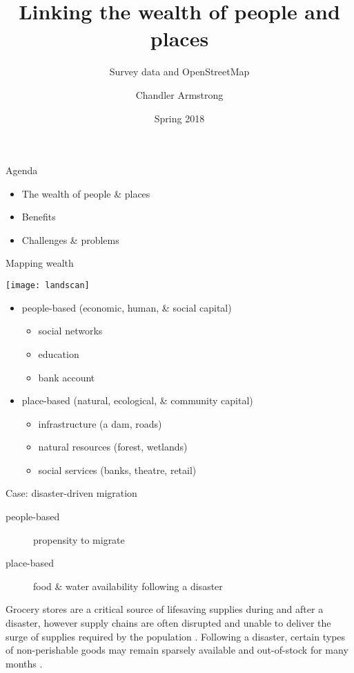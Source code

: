 \documentclass{beamer}
\title{Linking the wealth of people and places}
\subtitle{Survey data and OpenStreetMap}
\author{Chandler Armstrong}
\institute{CERL}
\date{Spring 2018}
\begin{document}
\begin{frame}
\titlepage
\end{frame}


\begin{frame}{Agenda}
  \begin{itemize}
  \item The wealth of people \& places
  \item Benefits
  \item Challenges \& problems
  \end{itemize}
\end{frame}


\begin{frame}{Mapping wealth}  
  \begin{center}
    \texttt{[image: landscan]}%
  \end{center}
  \begin{itemize}
  \item people-based (economic, human, \& social capital)
    \begin{itemize}
    \item social networks
    \item education
    \item bank account
    \end{itemize}
  \item place-based (natural, ecological, \& community capital)
    \begin{itemize}
    \item infrastructure (a dam, roads)
    \item natural resources (forest, wetlands)
    \item social services (banks, theatre, retail)
    \end{itemize}
  \end{itemize}
\end{frame}


\begin{frame}{Case: disaster-driven migration}
  \begin{description}
  \item[people-based] propensity to migrate
  \item[place-based] food \& water availability following a disaster
  \end{description}
Grocery stores are a critical source of lifesaving supplies during and after a disaster, however supply chains are often disrupted and unable to deliver the surge of supplies required by the population \cite{palin17}.  Following a disaster, certain types of non-perishable goods may remain sparsely available and out-of-stock for many months \cite{cavallo14}.
\end{frame}
\end{document}
